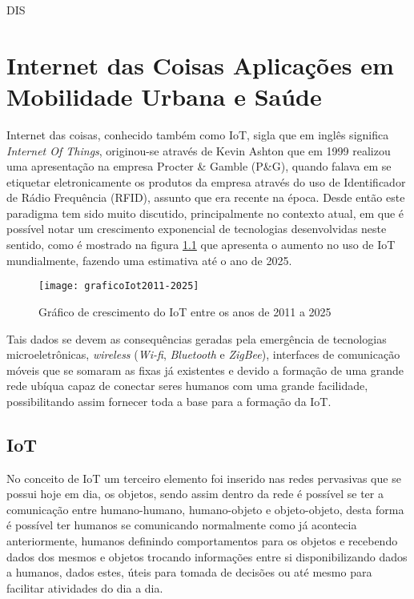 DIS\chapter{Internet das Coisas Aplicações em Mobilidade Urbana e Saúde}
\label{chap:cap1}
Internet das coisas, conhecido também como IoT, sigla que em inglês significa \textit{Internet Of Things}, originou-se através de Kevin Ashton que em 1999 realizou uma apresentação na empresa  Procter \& Gamble (P\&G), quando falava em se etiquetar eletronicamente os produtos da empresa através do uso de Identificador de Rádio Frequência (RFID), assunto que era recente na época. Desde então este paradigma tem sido muito discutido, principalmente no contexto atual, em que é possível notar um crescimento exponencial de tecnologias desenvolvidas neste sentido, como é mostrado na figura \ref{fig:graficoIot2011-2025} que apresenta o aumento no uso de IoT mundialmente, fazendo uma estimativa até o ano de 2025.\cite{historiaiot} 

\begin{figure}[htb]
\caption{\label{fig:graficoIot2011-2025}Gráfico de crescimento do IoT entre os anos de 2011 a 2025}
\begin{center}
\texttt{[image: graficoIot2011-2025]}
\end{center}
\end{figure}

Tais dados se devem as consequências geradas pela emergência de tecnologias microeletrônicas, \textit{wireless} (\textit{Wi-fi}, \textit{Bluetooth} e \textit{ZigBee}), interfaces de comunicação móveis que se somaram as fixas já existentes e devido a formação de uma grande rede ubíqua capaz de conectar seres humanos com uma grande facilidade, possibilitando assim fornecer toda a base para a formação da IoT. \cite{santaella2013} 

\section{IoT}
\label{sec:iot}
No conceito de IoT um terceiro elemento foi inserido nas redes pervasivas que se possui hoje em dia, os objetos, sendo assim dentro da rede é possível se ter a comunicação entre humano-humano, humano-objeto e objeto-objeto, desta forma é possível ter humanos se comunicando normalmente como já acontecia anteriormente, humanos definindo comportamentos para os objetos e recebendo dados dos mesmos e objetos trocando informações entre si disponibilizando dados a humanos, dados estes, úteis para tomada de decisões ou até mesmo para facilitar atividades do dia a dia.\cite{santaella2013}


